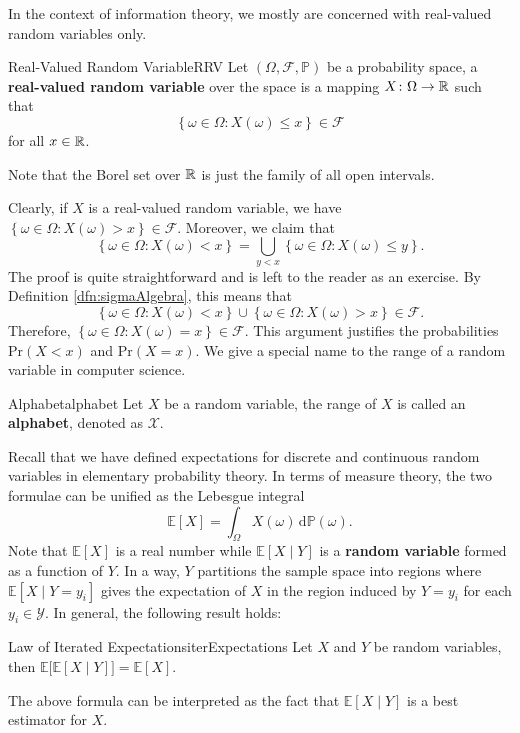 \documentclass[math]{amznotes}
\theoremstyle{remark}
\renewcommand{\d}{\mathrm{d}}
\begin{document}
In the context of information theory, we mostly are concerned with real-valued random variables only.
\begin{dfnbox}{Real-Valued Random Variable}{RRV}
    Let $\left(\Omega, \mathcal{F}, \mathbb{P}\right)$ be a probability space, a {\color{red} \textbf{real-valued random variable}} over the space is a mapping $X \colon \Omega \to \mathbb{R}$ such that 
    \begin{equation*}
        \left\{\omega \in \Omega \colon X\left(\omega\right) \leq x\right\} \in \mathcal{F}
    \end{equation*}
    for all $x \in \mathbb{R}$.
\end{dfnbox}
Note that the Borel set over $\mathbb{R}$ is just the family of all open intervals. 

Clearly, if $X$ is a real-valued random variable, we have $\left\{\omega \in \Omega \colon X\left(\omega\right) > x\right\} \in \mathcal{F}$. Moreover, we claim that 
\begin{equation*}
    \left\{\omega \in \Omega \colon X\left(\omega\right) < x\right\} = \bigcup_{y < x}\left\{\omega \in \Omega \colon X\left(\omega\right) \leq y\right\}.
\end{equation*}
The proof is quite straightforward and is left to the reader as an exercise. By Definition \ref{dfn:sigmaAlgebra}, this means that 
\begin{equation*}
    \left\{\omega \in \Omega \colon X\left(\omega\right) < x\right\} \cup \left\{\omega \in \Omega \colon X\left(\omega\right) > x\right\} \in \mathcal{F}.
\end{equation*}
Therefore, $\left\{\omega \in \Omega \colon X\left(\omega\right) = x\right\} \in \mathcal{F}$. This argument justifies the probabilities $\mathrm{Pr}\left(X < x\right)$ and $\mathrm{Pr}\left(X = x\right)$. We give a special name to the range of a random variable in computer science.
\begin{dfnbox}{Alphabet}{alphabet}
    Let $X$ be a random variable, the range of $X$ is called an {\color{red} \textbf{alphabet}}, denoted as $\mathcal{X}$.
\end{dfnbox}
Recall that we have defined expectations for discrete and continuous random variables in elementary probability theory. In terms of measure theory, the two formulae can be unified as the Lebesgue integral
\begin{equation*}
    \mathbb{E}[X] = \int_{\Omega}\!X\left(\omega\right)\,\d\mathbb{P}\left(\omega\right).
\end{equation*}
Note that $\mathbb{E}[X]$ is a real number while $\mathbb{E}[X \mid Y]$ is a \textbf{random variable} formed as a function of $Y$. In a way, $Y$ partitions the sample space into regions where $\mathbb{E}[X \mid Y = y_i]$ gives the expectation of $X$ in the region induced by $Y = y_i$ for each $y_i \in \mathcal{Y}$. In general, the following result holds:
\begin{thmbox}{Law of Iterated Expectations}{iterExpectations}
    Let $X$ and $Y$ be random variables, then $\mathbb{E}\bigl[\mathbb{E}[X \mid Y]\bigr] = \mathbb{E}[X]$.
\end{thmbox}
The above formula can be interpreted as the fact that $\mathbb{E}[X \mid Y]$ is a best estimator for $X$.
\end{document}
